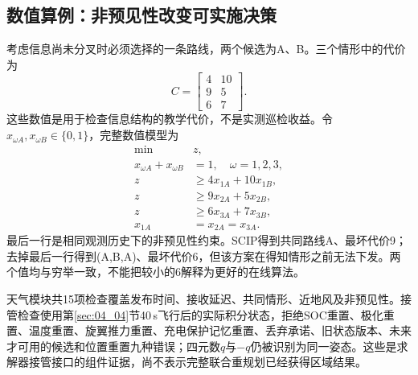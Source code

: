 \subsection{数值算例：非预见性改变可实施决策}

考虑信息尚未分叉时必须选择的一条路线，两个候选为A、B。三个情形中的代价为
\begin{equation}
 C=\begin{bmatrix}4&10\\9&5\\6&7\end{bmatrix}.
\end{equation}
这些数值是用于检查信息结构的教学代价，不是实测巡检收益。令$x_{\omega A},x_{\omega B}\in\{0,1\}$，完整数值模型为
\begin{align}
 \min\quad &z,\\
 x_{\omega A}+x_{\omega B}&=1,\quad\omega=1,2,3,\\
 z&\ge4x_{1A}+10x_{1B},\\
 z&\ge9x_{2A}+5x_{2B},\\
 z&\ge6x_{3A}+7x_{3B},\\
 x_{1A}&=x_{2A}=x_{3A}.
\end{align}
最后一行是相同观测历史下的非预见性约束。SCIP得到共同路线A、最坏代价9；去掉最后一行得到(A,B,A)、最坏代价6，但该方案在得知情形之前无法下发。两个值均与穷举一致，不能把较小的6解释为更好的在线算法。

天气模块共15项检查覆盖发布时间、接收延迟、共同情形、近地风及非预见性。接管检查使用第\ref{sec:04_04}节40\,s飞行后的实际积分状态，拒绝SOC重置、极化重置、温度重置、旋翼推力重置、充电保护记忆重置、丢弃承诺、旧状态版本、未来才可用的候选和位置重置九种错误；四元数$q$与$-q$仍被识别为同一姿态。这些是求解器接管接口的组件证据，尚不表示完整联合重规划已经获得区域结果。
